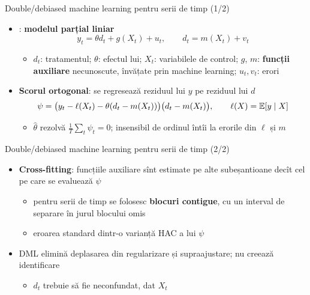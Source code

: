 \begin{frame}{Double/debiased machine learning pentru serii de timp (1/2)}
\itemsize{\small}
\begin{itemize}
    \item {}: \textbf{modelul parțial liniar} \[ y_t = \theta d_t + g(X_t) + u_t, \qquad d_t = m(X_t) + v_t \]
    \begin{itemize}
        \item $d_t$: tratamentul; $\theta$: efectul lui; $X_t$: variabilele de control; $g$, $m$: \textbf{funcții auxiliare} necunoscute, învățate prin machine learning; $u_t, v_t$: erori
    \end{itemize}
    \item \textbf{Scorul ortogonal}: se regresează reziduul lui $y$ pe reziduul lui $d$ \[ \psi = \big(y_t - \ell(X_t) - \theta(d_t - m(X_t))\big)\big(d_t - m(X_t)\big), \qquad \ell(X) = \mathbb{E}[y\mid X] \]
    \begin{itemize}
        \item $\hat\theta$ rezolvă $\frac1T\sum_t\psi_t = 0$; insensibil de ordinul întîi la erorile din $\ell$ și $m$
    \end{itemize}
\end{itemize}
\end{frame}

\begin{frame}{Double/debiased machine learning pentru serii de timp (2/2)}
\itemsize{\small}
\begin{itemize}
    \item \textbf{Cross-fitting}: funcțiile auxiliare sînt estimate pe alte subeșantioane decît cel pe care se evaluează $\psi$
    \begin{itemize}
        \item pentru serii de timp se folosesc \textbf{blocuri contigue}, cu un interval de separare în jurul blocului omis
        \item eroarea standard dintr-o varianță HAC a lui $\psi$
    \end{itemize}
    \item DML elimină deplasarea din regularizare și supraajustare; nu creează identificare
    \begin{itemize}
        \item $d_t$ trebuie să fie neconfundat, dat $X_t$
    \end{itemize}
\end{itemize}
\end{frame}

